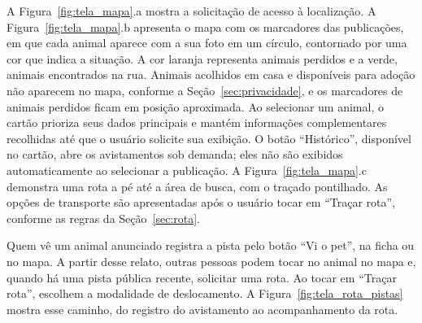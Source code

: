 A Figura~\ref{fig:tela_mapa}.a mostra a solicitação de acesso à localização. A Figura~\ref{fig:tela_mapa}.b apresenta o mapa com os marcadores das publicações, em que cada animal aparece com a sua foto em um círculo, contornado por uma cor que indica a situação. A cor laranja representa animais perdidos e a verde, animais encontrados na rua. Animais acolhidos em casa e disponíveis para adoção não aparecem no mapa, conforme a Seção~\ref{sec:privacidade}, e os marcadores de animais perdidos ficam em posição aproximada. Ao selecionar um animal, o cartão prioriza seus dados principais e mantém informações complementares recolhidas até que o usuário solicite sua exibição. O botão ``Histórico'', disponível no cartão, abre os avistamentos sob demanda; eles não são exibidos automaticamente ao selecionar a publicação. A Figura~\ref{fig:tela_mapa}.c demonstra uma rota a pé até a área de busca, com o traçado pontilhado. As opções de transporte são apresentadas após o usuário tocar em ``Traçar rota'', conforme as regras da Seção~\ref{sec:rota}.

Quem vê um animal anunciado registra a pista pelo botão ``Vi o pet'', na ficha ou no mapa. A partir desse relato, outras pessoas podem tocar no animal no mapa e, quando há uma pista pública recente, solicitar uma rota. Ao tocar em ``Traçar rota'', escolhem a modalidade de deslocamento. A Figura~\ref{fig:tela_rota_pistas} mostra esse caminho, do registro do avistamento ao acompanhamento da rota.

